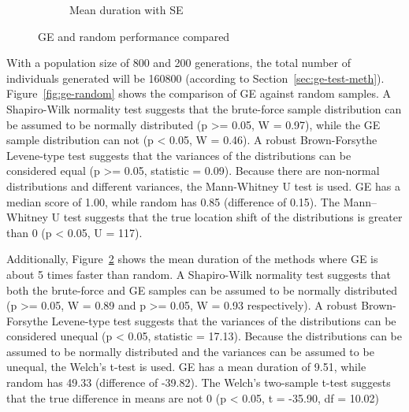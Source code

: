 \begin{figure}
\begin{subfigure}{0.4\textwidth}
        \caption{Mean duration with SE}
        \label{fig:ge-random-duration}
    \end{subfigure}
    \caption[GE and random performance compared]{\gls{GE} and random performance compared}
\end{figure}

With a population size of 800 and 200 generations, the total number of individuals generated will be 160800 (according to Section~\ref{sec:ge-test-meth}).
Figure~\ref{fig:ge-random} shows the comparison of \gls{GE} against random samples.
A Shapiro-Wilk normality test suggests that the brute-force sample distribution can be assumed to be normally distributed (p >= 0.05, W = 0.97), while the \gls{GE} sample distribution can not (p < 0.05, W = 0.46).
A robust Brown-Forsythe Levene-type test suggests that the variances of the distributions can be considered equal (p >= 0.05, statistic = 0.09).
Because there are non-normal distributions and different variances, the Mann-Whitney U test is used.
\gls{GE} has a median score of 1.00, while random has 0.85 (difference of 0.15).
The Mann–Whitney U test suggests that the true location shift of the distributions is greater than 0 (p < 0.05, U = 117).

Additionally, Figure~\ref{fig:ge-random-duration} shows the mean duration of the methods where \gls{GE} is about 5 times faster than random.
A Shapiro-Wilk normality test suggests that both the brute-force and \gls{GE} samples can be assumed to be normally distributed (p >= 0.05, W = 0.89 and p >= 0.05, W = 0.93 respectively).
A robust Brown-Forsythe Levene-type test suggests that the variances of the distributions can be considered unequal (p < 0.05, statistic = 17.13).
Because the distributions can be assumed to be normally distributed and the variances can be assumed to be unequal, the Welch's t-test is used.
\gls{GE} has a mean duration of 9.51, while random has 49.33 (difference of -39.82).
The Welch's two-sample t-test suggests that the true difference in means are not 0 (p < 0.05, t = -35.90, df = 10.02)

